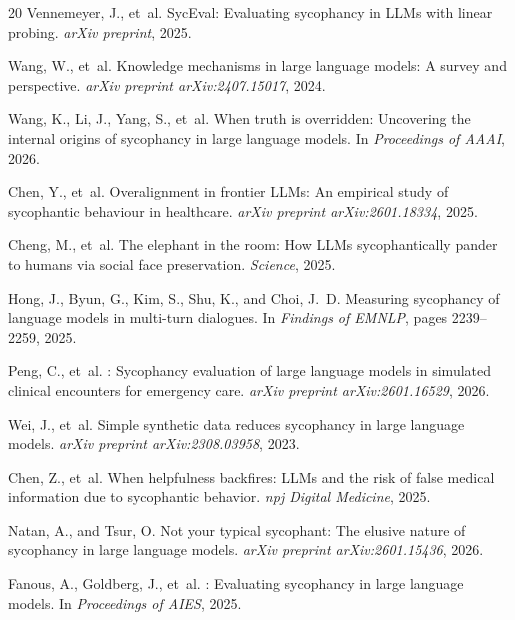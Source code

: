 \documentclass{article}
\begin{document}
\begin{thebibliography}{20}
Vennemeyer, J., et~al.
\newblock SycEval: Evaluating sycophancy in LLMs with linear probing.
\newblock \emph{arXiv preprint}, 2025.

Wang, W., et~al.
\newblock Knowledge mechanisms in large language models: A survey and perspective.
\newblock \emph{arXiv preprint arXiv:2407.15017}, 2024.

Wang, K., Li, J., Yang, S., et~al.
\newblock When truth is overridden: Uncovering the internal origins of sycophancy in large language models.
\newblock In \emph{Proceedings of AAAI}, 2026.

Chen, Y., et~al.
\newblock Overalignment in frontier {LLMs}: An empirical study of sycophantic behaviour in healthcare.
\newblock \emph{arXiv preprint arXiv:2601.18334}, 2025.

Cheng, M., et~al.
\newblock The elephant in the room: How {LLMs} sycophantically pander to humans via social face preservation.
\newblock \emph{Science}, 2025.

Hong, J., Byun, G., Kim, S., Shu, K., and Choi, J.~D.
\newblock Measuring sycophancy of language models in multi-turn dialogues.
\newblock In \emph{Findings of EMNLP}, pages 2239--2259, 2025.

Peng, C., et~al.
: Sycophancy evaluation of large language models in simulated clinical encounters for emergency care.
\newblock \emph{arXiv preprint arXiv:2601.16529}, 2026.

Wei, J., et~al.
\newblock Simple synthetic data reduces sycophancy in large language models.
\newblock \emph{arXiv preprint arXiv:2308.03958}, 2023.


Chen, Z., et~al.
\newblock When helpfulness backfires: {LLMs} and the risk of false medical information due to sycophantic behavior.
\newblock \emph{npj Digital Medicine}, 2025.

Natan, A., and Tsur, O.
\newblock Not your typical sycophant: The elusive nature of sycophancy in large language models.
\newblock \emph{arXiv preprint arXiv:2601.15436}, 2026.

Fanous, A., Goldberg, J., et~al.
: Evaluating sycophancy in large language models.
\newblock In \emph{Proceedings of AIES}, 2025.

\end{thebibliography}
\end{document}
